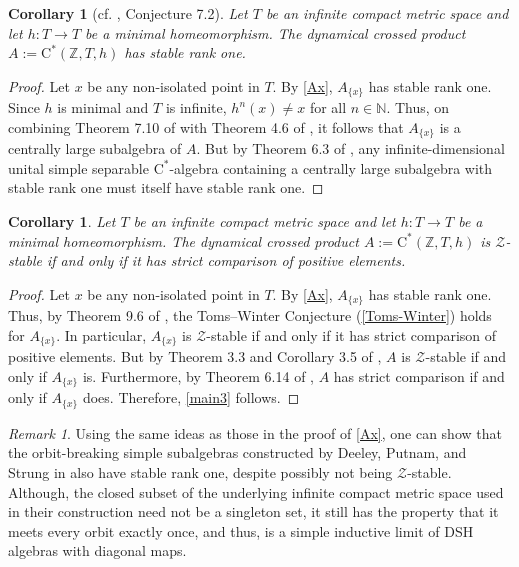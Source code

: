 \documentclass[12pt]{amsart}
\numberwithin{equation}{section}
\newtheorem{corollary}[theorem]{Corollary}
\theoremstyle{definition}
\theoremstyle{remark}
\newtheorem{remark}[theorem]{Remark}
\newcommand{\NN}{\mathbb{N}}
\begin{document}
\begin{corollary}[cf. \cite{arcphil}, Conjecture 7.2]
	\label{main2}
	Let $T$ be an infinite compact metric space and let $h\colon T\to T$ be a minimal homeomorphism. The dynamical crossed product $A:=\mathrm{C^*}(\mathbb{Z},T,h)$ has stable rank one. 
\end{corollary}

\begin{proof}
	Let $x$ be any non-isolated point in $T$. By \autoref{Ax}, $A_{\{x\}}$ has stable rank one. Since $h$ is minimal and $T$ is infinite, $h^{n}(x)\not=x$ for all $n\in\NN$. Thus, on combining Theorem 7.10 of \cite{phil2} with Theorem 4.6 of \cite{arcphil}, it follows that $A_{\{x\}}$ is a centrally large subalgebra of $A$. But by Theorem 6.3 of \cite{arcphil}, any infinite-dimensional unital simple separable $\mathrm{C}^*$-algebra containing a centrally large subalgebra with stable rank one must itself have stable rank one. 
\end{proof}	

\begin{corollary}
	\label{main3}
	Let $T$ be an infinite compact metric space and let $h\colon T\to T$ be a minimal homeomorphism. The dynamical crossed product $A:=\mathrm{C^*}(\mathbb{Z},T,h)$ is $\mathcal{Z}$-stable if and only if it has strict comparison of positive elements. 
\end{corollary}

\begin{proof}
	Let $x$ be any non-isolated point in $T$. By \autoref{Ax}, $A_{\{x\}}$ has stable rank one. Thus, by Theorem 9.6 of \cite{thi}, the Toms--Winter Conjecture (\autoref{Toms-Winter}) holds for $A_{\{x\}}$. In particular, $A_{\{x\}}$ is $\mathcal{Z}$-stable if and only if it has strict comparison of positive elements. But by Theorem 3.3 and Corollary 3.5 of \cite{ABP}, $A$ is $\mathcal{Z}$-stable if and only if $A_{\{x\}}$ is. Furthermore, by Theorem 6.14 of \cite{phil2}, $A$ has strict comparison if and only if $A_{\{x\}}$ does. Therefore, \autoref{main3} follows. 
\end{proof}

\begin{remark}
	\label{referee}
	Using the same ideas as those in the proof of \autoref{Ax}, one can show that the orbit-breaking simple subalgebras constructed by Deeley, Putnam, and Strung in \cite{DPS} also have stable rank one, despite possibly not being $\mathcal{Z}$-stable. Although, the closed subset of the underlying infinite compact metric space used in their construction need not be a singleton set, it still has the property that it meets every orbit exactly once, and thus, is a simple inductive limit of DSH algebras with diagonal maps.
\end{remark}
\end{document}
